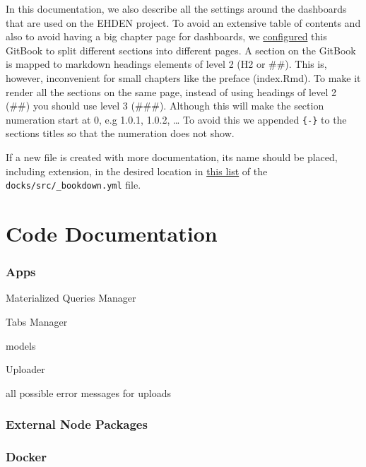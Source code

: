 \documentclass[
]{book}
\begin{document}
In this documentation, we also describe all the settings around the dashboards that are used on the EHDEN project.
To avoid an extensive table of contents and also to avoid having a big chapter page for dashboards, we \href{https://github.com/EHDEN/NetworkDashboards/blob/master/docs/src/_output.yml\#L9}{configured} this GitBook to split different sections into different pages.
A section on the GitBook is mapped to markdown headings elements of level 2 (H2 or \#\#).
This is, however, inconvenient for small chapters like the preface (index.Rmd).
To make it render all the sections on the same page, instead of using headings of level 2 (\#\#) you should use level 3 (\#\#\#).
Although this will make the section numeration start at 0, e.g 1.0.1, 1.0.2, \ldots{}
To avoid this we appended \texttt{\{-\}} to the sections titles so that the numeration does not show.

If a new file is created with more documentation, its name should be placed, including extension, in the desired location in \href{https://github.com/EHDEN/NetworkDashboards/blob/master/docs/src/_bookdown.yml\#L26-L45}{this list} of the \texttt{docks/src/\_bookdown.yml} file.

\hypertarget{code-documentation}{%
\chapter{Code Documentation}\label{code-documentation}}

\hypertarget{apps}{%
\subsection*{Apps}\label{apps}}

Materialized Queries Manager

Tabs Manager

models

Uploader

all possible error messages for uploads

\hypertarget{external-node-packages}{%
\subsection*{External Node Packages}\label{external-node-packages}}

\hypertarget{docker}{%
\subsection*{Docker}\label{docker}}
\end{document}
